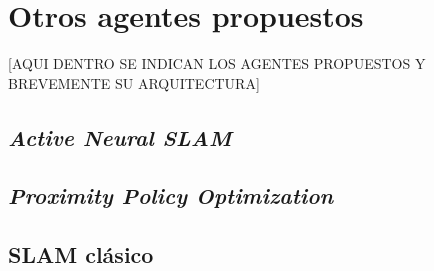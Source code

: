 \section{Otros agentes propuestos}
[AQUI DENTRO SE INDICAN LOS AGENTES PROPUESTOS Y BREVEMENTE SU ARQUITECTURA]
\subsection{\textit{Active Neural SLAM}}

\subsection{\textit{Proximity Policy Optimization}}

\subsection{SLAM clásico}
